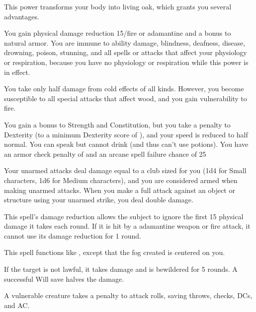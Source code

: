 \begin{spelleffect}
  This power transforms your body into living oak, which grants you several advantages.
  \par You gain physical damage reduction 15/fire or adamantine and a  bonus to natural armor. You are immune to ability damage, blindness, deafness, disease, drowning, poison, stunning, and all spells or attacks that affect your physiology or respiration, because you have no physiology or respiration while this power is in effect.
  \par You take only half damage from cold effects of all kinds. However, you become susceptible to all special attacks that affect wood, and you gain vulnerability to fire.
  \par You gain a  bonus to Strength and Constitution, but you take a  penalty to Dexterity (to a minimum Dexterity score of ), and your speed is reduced to half normal. You can speak but cannot drink (and thus can't use potions). You have an armor check penalty of  and an arcane spell failure chance of 25%
  \par Your unarmed attacks deal damage equal to a club sized for you (1d4 for Small characters, 1d6 for Medium characters), and you are considered armed when making unarmed attacks. When you make a full attack against an object or structure using your unarmed strike, you deal double damage.
\end{spelleffect}
\begin{spellnotes}
  This spell's damage reduction allows the subject to ignore the first 15 physical damage it takes each round. If it is hit by a adamantine weapon or fire attack, it cannot use its damage reduction for 1 round.
\end{spellnotes}

\begin{spelleffect}
  This spell functions like , except that the fog created is centered on you.
\end{spelleffect}

\spellrng{\rngmed}
\begin{spelleffect}
  If the target is not lawful, it takes damage and is bewildered for 5 rounds. A successful Will save halves the damage.
\end{spelleffect}
\begin{spellnotes}
  A vulnerable creature takes a  penalty to attack rolls, saving throws, checks, DCs, and AC.
\end{spellnotes}

